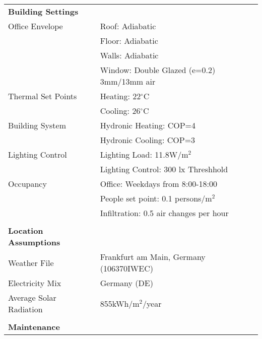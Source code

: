\begin{description}
\begin{table}[H]
\centering
\begin{tabular}{ll}
\hline
\textbf{Building Settings}    &                                                \\
Office Envelope               & Roof: Adiabatic                                \\
                              & Floor: Adiabatic                               \\
                              & Walls: Adiabatic                               \\
                              & Window: Double Glazed (e=0.2) 3mm/13mm air \\
Thermal Set Points            & Heating: 22$^{\circ}$C          \\
                              & Cooling: 26$^{\circ}$C          \\
Building System               & Hydronic Heating: COP=4                        \\
                              & Hydronic Cooling: COP=3                        \\
Lighting Control              & Lighting Load: 11.8W/m$^2$                                  \\
                              & Lighting Control: 300 lx Threshhold            \\
Occupancy                     & Office: Weekdays from 8:00-18:00               \\
                              & People set point: 0.1 persons/m$^2$               \\
                              & Infiltration: 0.5 air changes per hour                     \\
                              &                                                \\
\textbf{Location Assumptions} &                                                \\
Weather File                  & Frankfurt am Main, Germany (106370IWEC)               \\
Electricity Mix               & Germany (DE) \cite{itten2012life}                   \\
Average Solar Radiation               & 855kWh/m$^2$/year                              \\
                              &                                                \\
\textbf{Maintenance}          &                                                \\

\end{tabular}
\end{table}
\end{description}
